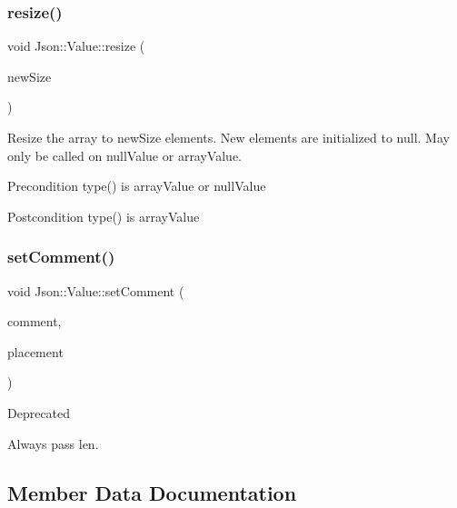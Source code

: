 \subsubsection{\texorpdfstring{resize()}{resize()}}
{\footnotesize\ttfamily void Json\+::\+Value\+::resize (\begin{DoxyParamCaption}\item[{Array\+Index}]{new\+Size }\end{DoxyParamCaption})}

Resize the array to new\+Size elements. New elements are initialized to null. May only be called on null\+Value or array\+Value. \begin{DoxyPrecond}{Precondition}
type() is array\+Value or null\+Value 
\end{DoxyPrecond}
\begin{DoxyPostcond}{Postcondition}
type() is array\+Value 
\end{DoxyPostcond}
\mbox{\label{classJson_1_1Value_a29f3a30f7e5d3af6f38d57999bf5b480}} 
\subsubsection{\texorpdfstring{set\+Comment()}{setComment()}}
{\footnotesize\ttfamily void Json\+::\+Value\+::set\+Comment (\begin{DoxyParamCaption}\item[{const char $\ast$}]{comment,  }\item[{\hyperlink{namespaceJson_a4fc417c23905b2ae9e2c47d197a45351}{Comment\+Placement}}]{placement }\end{DoxyParamCaption})}

\begin{DoxyRefDesc}{Deprecated}
\item[\hyperlink{deprecated__deprecated000003}{Deprecated}]Always pass len. \end{DoxyRefDesc}


\subsection{Member Data Documentation}
\mbox{\label{classJson_1_1Value_a21ddb05b92c60c7548e928bf371e7d45}} 
